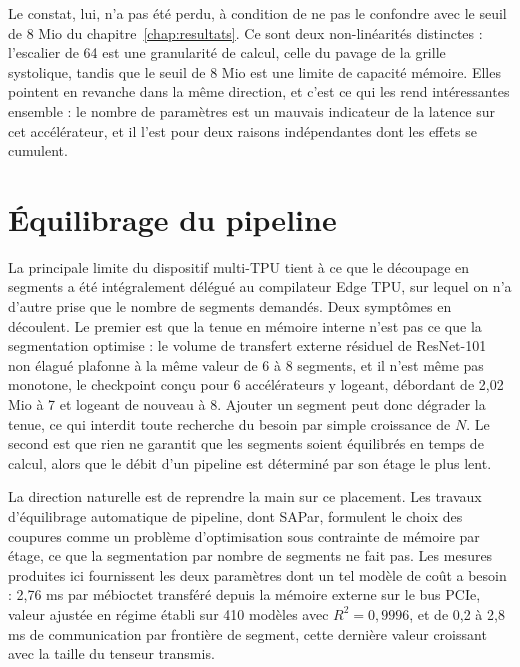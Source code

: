 \documentclass[11pt,a4paper]{report}
\begin{document}
Le constat, lui, n'a pas été perdu, à condition de ne pas le confondre avec le seuil de 8 Mio du chapitre~\ref{chap:resultats}. Ce sont deux non-linéarités distinctes : l'escalier de 64 est une granularité de calcul, celle du pavage de la grille systolique, tandis que le seuil de 8 Mio est une limite de capacité mémoire. Elles pointent en revanche dans la même direction, et c'est ce qui les rend intéressantes ensemble : le nombre de paramètres est un mauvais indicateur de la latence sur cet accélérateur, et il l'est pour deux raisons indépendantes dont les effets se cumulent.


\section{Équilibrage du pipeline}

La principale limite du dispositif multi-TPU tient à ce que le découpage en segments a été intégralement délégué au compilateur Edge TPU, sur lequel on n'a d'autre prise que le nombre de segments demandés. Deux symptômes en découlent. Le premier est que la tenue en mémoire interne n'est pas ce que la segmentation optimise : le volume de transfert externe résiduel de ResNet-101 non élagué plafonne à la même valeur de 6 à 8 segments, et il n'est même pas monotone, le checkpoint conçu pour 6 accélérateurs y logeant, débordant de 2,02 Mio à 7 et logeant de nouveau à 8. Ajouter un segment peut donc dégrader la tenue, ce qui interdit toute recherche du besoin par simple croissance de $N$. Le second est que rien ne garantit que les segments soient équilibrés en temps de calcul, alors que le débit d'un pipeline est déterminé par son étage le plus lent.

La direction naturelle est de reprendre la main sur ce placement. Les travaux d'équilibrage automatique de pipeline, dont SAPar, formulent le choix des coupures comme un problème d'optimisation sous contrainte de mémoire par étage, ce que la segmentation par nombre de segments ne fait pas. Les mesures produites ici fournissent les deux paramètres dont un tel modèle de coût a besoin : 2,76 ms par mébioctet transféré depuis la mémoire externe sur le bus PCIe, valeur ajustée en régime établi sur 410 modèles avec $R^2 = 0{,}9996$, et de 0,2 à 2,8 ms de communication par frontière de segment, cette dernière valeur croissant avec la taille du tenseur transmis.
\end{document}
